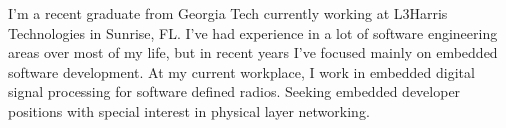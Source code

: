 I'm a recent graduate from Georgia Tech currently working at L3Harris Technologies in Sunrise, FL.
I've had experience in a lot of software engineering areas over most of my life,
but in recent years I've focused mainly on embedded software development.
At my current workplace, I work in embedded digital signal processing for software defined radios.
Seeking embedded developer positions with special interest in physical layer networking.